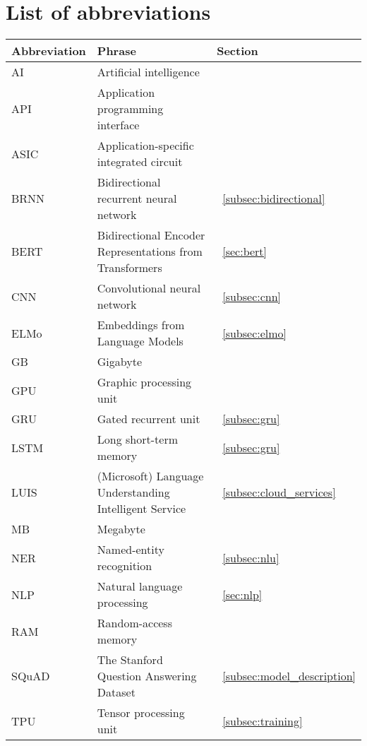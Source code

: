 \chapter*{List of abbreviations}
\label{ch:abbrevations}

\begin{tabular}{l l l}
    \textbf{Abbreviation} & \textbf{Phrase} & \textbf{Section} \\
    \hline
    AI & Artificial intelligence \\
    API & Application programming interface\\
    ASIC & Application-specific integrated circuit\\
    BRNN & Bidirectional recurrent neural network &~\ref{subsec:bidirectional}\\
    BERT & Bidirectional Encoder Representations from Transformers &~\ref{sec:bert}\\
    CNN & Convolutional neural network &~\ref{subsec:cnn}\\
    ELMo & Embeddings from Language Models &~\ref{subsec:elmo}\\
    GB & Gigabyte\\
    GPU & Graphic processing unit \\
    GRU & Gated recurrent unit &~\ref{subsec:gru}\\
    LSTM & Long short-term memory &~\ref{subsec:gru}\\
    LUIS & (Microsoft) Language Understanding Intelligent Service &~\ref{subsec:cloud_services}\\
    MB & Megabyte\\
    NER & Named-entity recognition &~\ref{subsec:nlu}\\
    NLP & Natural language processing &~\ref{sec:nlp}\\
    RAM & Random-access memory \\
    SQuAD & The Stanford Question Answering Dataset &~\ref{subsec:model_description}\\
    TPU & Tensor processing unit &~\ref{subsec:training}\\
\end{tabular}